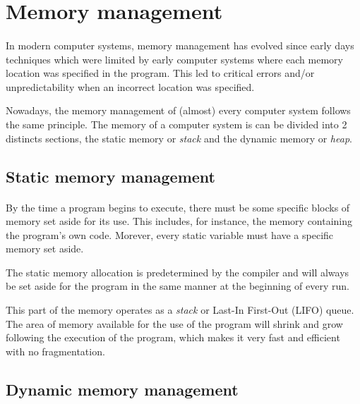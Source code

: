 \section{Memory management}





\paragraph{}
In modern computer systems, memory management has evolved since early days techniques which were limited
    by early computer systems where each memory location was specified in the program.
This led to critical errors and/or unpredictability when an incorrect location was specified.

Nowadays, the memory management of (almost) every computer system follows the same principle.
The memory of a computer system is can be divided into 2 distincts sections,
    the static memory or \textit{stack} and the dynamic memory or \textit{heap}.

\subsection{Static memory management}
\paragraph{}
By the time a program begins to execute, there must be some specific blocks of memory set aside for its use.
This includes, for instance, the memory containing the program's own code.
Morever, every static variable must have a specific memory set aside.

The static memory allocation is predetermined by the compiler
    and will always be set aside for the program in the same manner at the beginning of every run.

This part of the memory operates as a \textit{stack} or Last-In First-Out (LIFO) queue.
The area of memory available for the use of the program will shrink and grow following the execution of the program,
which makes it very fast and efficient with no fragmentation.

\subsection{Dynamic memory management}
